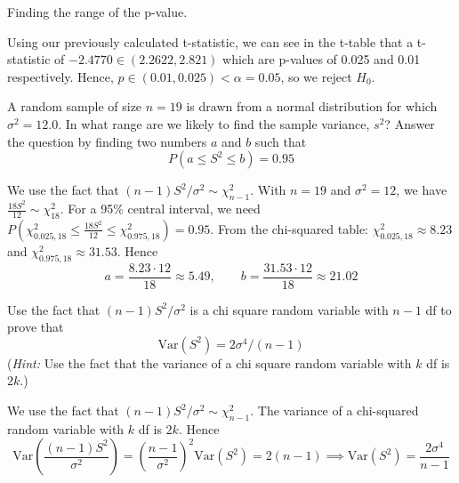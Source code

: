 \documentclass{article}
\newcommand{\V}{\text{Var}}
\begin{document}
\begin{probset}
\begin{prob}[\textbf{7.4.21}]
\begin{subprobset}
    \begin{subprob}
        Finding the range of the p-value.

        \begin{soln}
            Using our previously calculated t-statistic, we can see in the t-table that a t-statistic of $-2.4770 \in (2.2622, 2.821)$ which are p-values of 0.025 and 0.01 respectively. Hence, $p \in (0.01, 0.025) < \alpha = 0.05$, so we reject $H_0$.
        \end{soln}
    \end{subprob}
    \end{subprobset}
\end{prob}

\begin{prob}[\textbf{7.5.8}]
    A random sample of size $n = 19$ is drawn from a normal distribution for which $\sigma^2 = 12.0$. In what range are we likely to find the sample variance, $s^2$? Answer the question by finding two numbers $a$ and $b$ such that 
    $$P(a \leq S^2 \leq b) = 0.95$$

    \begin{soln}
        We use the fact that $(n-1)S^2/\sigma^2 \sim \chi^2_{n-1}$. With $n = 19$ and $\sigma^2 = 12$, we have $\frac{18S^2}{12} \sim \chi^2_{18}$. For a 95\% central interval, we need $P(\chi^2_{0.025,18} \leq \frac{18S^2}{12} \leq \chi^2_{0.975,18}) = 0.95$. From the chi-squared table: $\chi^2_{0.025,18} \approx 8.23$ and $\chi^2_{0.975,18} \approx 31.53$. Hence
        \[
            a = \frac{8.23 \cdot 12}{18} \approx 5.49, \qquad b = \frac{31.53 \cdot 12}{18} \approx 21.02
        \]
    \end{soln}
\end{prob}

\newpage

\begin{prob}[\textbf{7.3.4}]
    Use the fact that $(n-1)S^2/\sigma^2$ is a chi square random variable with $n - 1$ df to prove that
    $$\V(S^2) = 2\sigma^4 / (n - 1)$$
    (\textit{Hint:} Use the fact that the variance of a chi square random variable with $k$ df is $2k$.)

    \begin{soln}
        We use the fact that $(n-1)S^2/\sigma^2 \sim \chi^2_{n-1}$. The variance of a chi-squared random variable with $k$ df is $2k$. Hence
        \[
            \V\left(\frac{(n-1) S^2}{\sigma^2}\right) = \left(\frac{n-1}{\sigma^2}\right)^2 \V(S^2) = 2(n-1) \implies \V(S^2) = \frac{2\sigma^4}{n-1}
        \]
    \end{soln}
\end{prob}


\end{probset}
\end{document}
